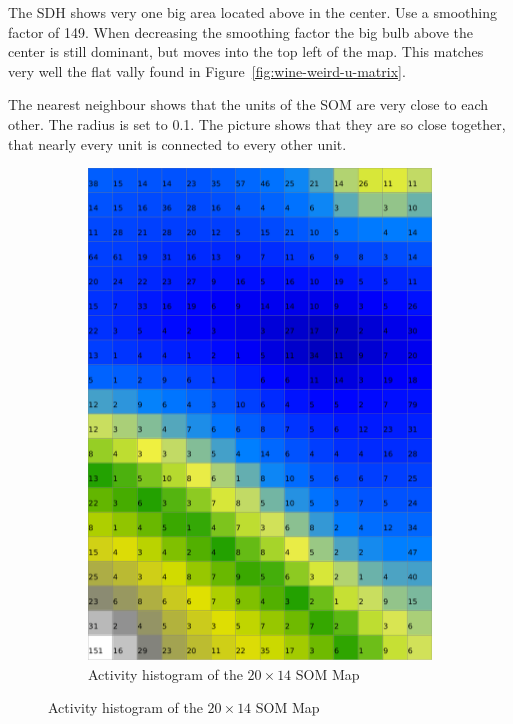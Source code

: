 \documentclass{acm_proc_article-sp}
\begin{document}
The SDH shows very one big area located above in the center. Use a smoothing factor of 149.
When decreasing the smoothing factor the big bulb above the center is still dominant,
but moves into the top left of the map. This matches very well the flat vally found in
Figure~\ref{fig:wine-weird-u-matrix}.

The nearest neighbour shows that the units of the SOM are very close to each other. The 
radius is set to 0.1. The picture shows that they are so close together, that
nearly every unit is connected to every other unit.

\begin{figure}
    \centering
    \begin{subfigure}[b]{0.45\linewidth}
        \includegraphics[width=\linewidth]{img/wine-weird-activity-histogram}
        \caption{Activity histogram of the $20\times14$ SOM Map}

\end{subfigure}
\end{figure}
\end{document}
